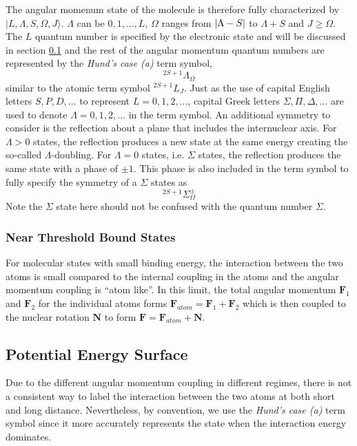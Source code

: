 The angular momenum state of the molecule is therefore fully characterized by
$|L,\Lambda,S,\Omega,J\rangle$. $\Lambda$ can be $0,1,\dots,L$, $\Omega$ ranges from
${\left|{\Lambda-S}\right|}$ to $\Lambda+S$ and $J\geqslant\Omega$.
The $L$ quantum number is specified by the electronic state and will be discussed
in section \ref{ch:pa:pes} and the rest of the angular momentum quantum numbers
are represented by the \textit{Hund's case (a)} term symbol,
\[ ^{2S+1}\Lambda_\Omega \]
similar to the atomic term symbol $^{2S+1}L_J$.
Just as the use of capital English letters $S,P,D,\dots$ to represent
$L=0,1,2,\dots$, capital Greek letters $\Sigma,\Pi,\Delta,\dots$ are used
to denote $\Lambda=0,1,2,\dots$ in the term symbol.
An additional symmetry to consider is the reflection about a plane that includes
the internuclear axis.
For $\Lambda>0$ states, the reflection produces a new state at the same energy
creating the so-called $\Lambda$-doubling. For $\Lambda=0$ states, i.e. $\Sigma$ states,
the reflection produces the same state with a phase of $\pm1$.
This phase is also included in the term symbol to fully specify the symmetry of
a $\Sigma$ states as
\[ ^{2S+1}\Sigma_\Omega^{\pm} \]
Note the $\Sigma$ state here should not be confused with the quantum number $\Sigma$.


\subsubsection{Near Threshold Bound States}

For molecular states with small binding energy, the interaction between the two atoms is
small compared to the internal coupling in the atoms and
the angular momentum coupling is ``atom like''.
In this limit, the total angular momentum $\mathbf{F}_1$ and $\mathbf{F}_2$
for the individual atoms forms $\mathbf{F}_{atom}=\mathbf{F}_1+\mathbf{F}_2$
which is then coupled to the nuclear rotation $\mathbf{N}$
to form $\mathbf{F}=\mathbf{F}_{atom}+\mathbf{N}$.


\subsection{Potential Energy Surface}
\label{ch:pa:pes}

Due to the different angular momentum coupling in different regimes,
there is not a consistent way to label the interaction between the two atoms
at both short and long distance.
Nevertheless, by convention, we use the \textit{Hund's case (a)} term symbol
since it more accurately represents the state when the interaction energy dominates.

